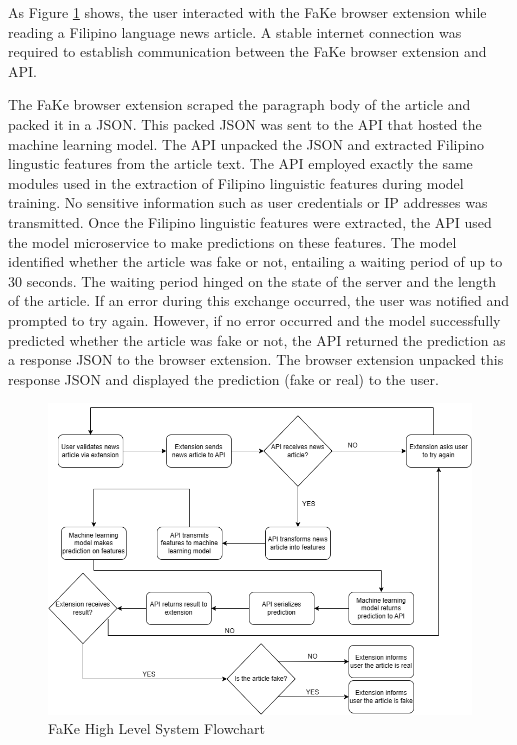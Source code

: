 As Figure \ref{SystemFlowchart} shows, the user interacted with the FaKe browser extension while reading a Filipino language news article. A stable internet connection was required to establish communication between the FaKe browser extension and API.

The FaKe browser extension scraped the paragraph body of the article and packed it in a JSON. This packed JSON was sent to the API that hosted the machine learning model. The API unpacked the JSON and extracted Filipino lingustic features from the article text. The API employed exactly the same modules used in the extraction of Filipino linguistic features during model training. No sensitive information such as user credentials or IP addresses was transmitted. Once the Filipino linguistic features were extracted, the API used the model microservice to make predictions on these features. The model identified whether the article was fake or not, entailing a waiting period of up to 30 seconds. The waiting period hinged on the state of the server and the length of the article. If an error during this exchange occurred, the user was notified and prompted to try again. However, if no error occurred and the model successfully predicted whether the article was fake or not, the API returned the prediction as a response JSON to the browser extension. The browser extension unpacked this response JSON and displayed the prediction (fake or real) to the user.

\begin{figure}[h]
\includegraphics[width=\textwidth,height=\textheight,keepaspectratio]{figures/FakeSystemFlowchart.png}
  \caption{FaKe High Level System Flowchart}
  \label{SystemFlowchart}
\end{figure}
\clearpage


